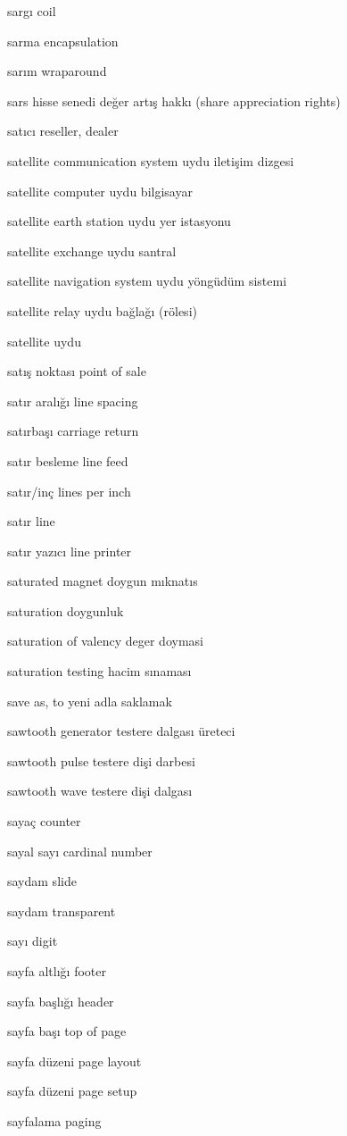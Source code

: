 \documentclass[12pt,fleqn]{article}\usepackage{../../common}
\begin{document}
sargı coil

sarma encapsulation

sarım wraparound

sars hisse senedi değer artış hakkı (share appreciation rights)

satıcı reseller, dealer

satellite communication system uydu iletişim dizgesi

satellite computer uydu bilgisayar

satellite earth station uydu yer istasyonu

satellite exchange uydu santral

satellite navigation system uydu yöngüdüm sistemi

satellite relay uydu bağlağı (rölesi)

satellite uydu

satış noktası point of sale

satır aralığı line spacing

satırbaşı carriage return

satır besleme line feed

satır/inç lines per inch

satır line

satır yazıcı line printer

saturated magnet doygun mıknatıs

saturation doygunluk

saturation of valency deger doymasi

saturation testing hacim sınaması

save as, to yeni adla saklamak

sawtooth generator testere dalgası üreteci

sawtooth pulse testere dişi darbesi

sawtooth wave testere dişi dalgası

sayaç counter

sayal sayı cardinal number

saydam slide

saydam transparent

sayı digit

sayfa altlığı footer

sayfa başlığı header

sayfa başı top of page

sayfa düzeni page layout

sayfa düzeni page setup

sayfalama paging
\end{document}
